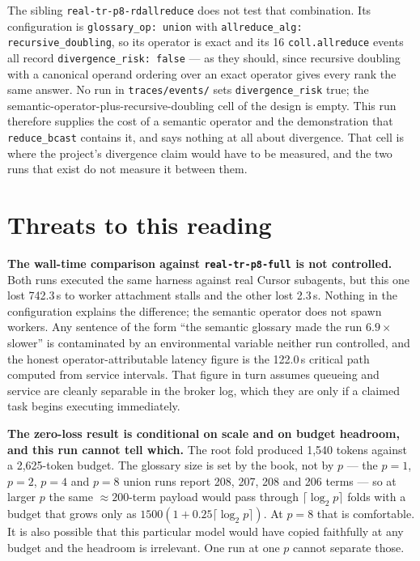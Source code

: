 \documentclass[11pt]{article}
\begin{document}
The sibling \texttt{real-tr-p8-rdallreduce} does not test that combination. Its configuration is
\texttt{glossary\_op: union} with \texttt{allreduce\_alg: recursive\_doubling}, so its operator is
exact and its 16 \texttt{coll.allreduce} events all record \texttt{divergence\_risk: false} --- as
they should, since recursive doubling with a canonical operand ordering over an exact operator
gives every rank the same answer. No run in \texttt{traces/events/} sets
\texttt{divergence\_risk} true; the semantic-operator-plus-recursive-doubling cell of the design
is empty. This run therefore supplies the cost of a semantic operator and the demonstration that
\texttt{reduce\_bcast} contains it, and says nothing at all about divergence. That cell is where
the project's divergence claim would have to be measured, and the two runs that exist do not
measure it between them.

\section{Threats to this reading}
\label{sec:threats}

\textbf{The wall-time comparison against \texttt{real-tr-p8-full} is not controlled.} Both runs
executed the same harness against real Cursor subagents, but this one lost 742.3\,s to worker
attachment stalls and the other lost 2.3\,s. Nothing in the configuration explains the
difference; the semantic operator does not spawn workers. Any sentence of the form ``the semantic
glossary made the run $6.9\times$ slower'' is contaminated by an environmental variable neither
run controlled, and the honest operator-attributable latency figure is the 122.0\,s critical path
computed from service intervals. That figure in turn assumes queueing and service are cleanly
separable in the broker log, which they are only if a claimed task begins executing immediately.

\textbf{The zero-loss result is conditional on scale and on budget headroom, and this run cannot
tell which.} The root fold produced 1{,}540 tokens against a 2{,}625-token budget. The glossary
size is set by the book, not by $p$ --- the $p=1$, $p=2$, $p=4$ and $p=8$ union runs report 208,
207, 208 and 206 terms --- so at larger $p$ the same $\approx200$-term payload would pass through
$\lceil\log_2 p\rceil$ folds with a budget that grows only as $1500(1+0.25\lceil\log_2 p\rceil)$.
At $p=8$ that is comfortable. It is also possible that this particular model would have copied
faithfully at any budget and the headroom is irrelevant. One run at one $p$ cannot separate those.
\end{document}
